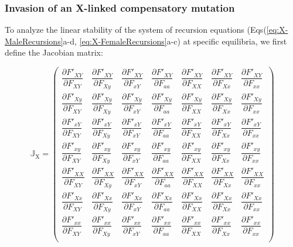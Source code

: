 \documentclass{article}
\begin{document}
\subsubsection{Invasion of an X-linked compensatory mutation}

To analyze the linear stability of the system of recursion equations (Eqs(\ref{eq:X-MaleRecursions}a-d, \ref{eq:X-FemaleRecursions}a-c) at specific equilibria, we first define the Jacobian matrix:

\begin{equation}
	\mathbb{J}_{\text{X}} = \left( \begin{array}{ccccccc} 
		\dfrac{\partial  F'_{XY}}{\partial F_{XY}} & \dfrac{\partial  F'_{XY}}{\partial F_{Xy}} & \dfrac{\partial  F'_{XY}}{\partial F_{xY}} & \dfrac{\partial  F'_{XY}}{\partial F_{aa}} & \dfrac{\partial  F'_{XY}}{\partial F_{XX}} & \dfrac{\partial  F'_{XY}}{\partial F_{Xx}} & \dfrac{\partial  F'_{XY}}{\partial F_{xx}} \\ 
		\dfrac{\partial  F'_{Xy}}{\partial F_{XY}} & \dfrac{\partial  F'_{Xy}}{\partial F_{Xy}} & \dfrac{\partial  F'_{Xy}}{\partial F_{xY}} & \dfrac{\partial  F'_{Xy}}{\partial F_{aa}} & \dfrac{\partial  F'_{Xy}}{\partial F_{XX}} & \dfrac{\partial  F'_{Xy}}{\partial F_{Xx}} & \dfrac{\partial  F'_{Xy}}{\partial F_{xx}} \\ 
		\dfrac{\partial  F'_{xY}}{\partial F_{XY}} & \dfrac{\partial  F'_{xY}}{\partial F_{Xy}} & \dfrac{\partial  F'_{xY}}{\partial F_{xY}} & \dfrac{\partial  F'_{xY}}{\partial F_{aa}} & \dfrac{\partial  F'_{xY}}{\partial F_{XX}} & \dfrac{\partial  F'_{xY}}{\partial F_{Xx}} & \dfrac{\partial  F'_{xY}}{\partial F_{xx}} \\ 
		\dfrac{\partial  F'_{xy}}{\partial F_{XY}} & \dfrac{\partial  F'_{xy}}{\partial F_{Xy}} & \dfrac{\partial  F'_{xy}}{\partial F_{xY}} & \dfrac{\partial  F'_{xy}}{\partial F_{aa}} & \dfrac{\partial  F'_{xy}}{\partial F_{XX}} & \dfrac{\partial  F'_{xy}}{\partial F_{Xx}} & \dfrac{\partial  F'_{xy}}{\partial F_{xx}} \\ 
		\dfrac{\partial  F'_{XX}}{\partial F_{XY}} & \dfrac{\partial  F'_{XX}}{\partial F_{Xy}} & \dfrac{\partial  F'_{XX}}{\partial F_{xY}} & \dfrac{\partial  F'_{XX}}{\partial F_{aa}} & \dfrac{\partial  F'_{XX}}{\partial F_{XX}} & \dfrac{\partial  F'_{XX}}{\partial F_{Xx}} & \dfrac{\partial  F'_{XX}}{\partial F_{xx}} \\ 
		\dfrac{\partial  F'_{Xx}}{\partial F_{XY}} & \dfrac{\partial  F'_{Xx}}{\partial F_{Xy}} & \dfrac{\partial  F'_{Xx}}{\partial F_{xY}} & \dfrac{\partial  F'_{Xx}}{\partial F_{aa}} & \dfrac{\partial  F'_{Xx}}{\partial F_{XX}} & \dfrac{\partial  F'_{Xx}}{\partial F_{Xx}} & \dfrac{\partial  F'_{Xx}}{\partial F_{xx}} \\ 
		\dfrac{\partial  F'_{xx}}{\partial F_{XY}} & \dfrac{\partial  F'_{xx}}{\partial F_{Xy}} & \dfrac{\partial  F'_{xx}}{\partial F_{xY}} & \dfrac{\partial  F'_{xx}}{\partial F_{aa}} & \dfrac{\partial  F'_{xx}}{\partial F_{XX}} & \dfrac{\partial  F'_{xx}}{\partial F_{Xx}} & \dfrac{\partial  F'_{xx}}{\partial F_{xx}} \\ 
	\end{array} \right)
\end{equation}
\end{document}
